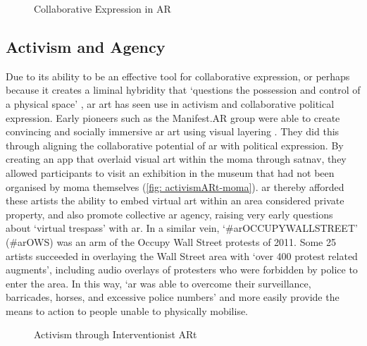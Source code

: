 \begin{figure}[ht]
    \centering
    \captionsetup{justification=centering}
    \hfill
    \caption{Collaborative Expression in AR}
    \label{fig: collaborativeARt}
\end{figure}

\subsection{Activism and Agency}\label{sec: ar-arts-activism}
Due to its ability to be an effective tool for collaborative expression, or perhaps because it creates a liminal hybridity that `questions the possession and control of a physical space' \citep{thiel2018}, \gls{ar} art has seen use in activism and collaborative political expression. Early pioneers such as the Manifest.AR group were able to create convincing and socially immersive \gls{ar} art using visual layering \citep{veenhof2010}. They did this through aligning the collaborative potential of \gls{ar} with political expression. By creating an app that overlaid visual art within the \gls{moma} through \gls{satnav}, they allowed participants to visit an exhibition in the museum that had not been organised by \gls{moma} themselves (\autoref{fig: activismARt-moma}). \gls{ar} thereby afforded these artists the ability to embed virtual art within an area considered private property, and also promote collective \gls{ar} agency, raising very early questions about `virtual trespass' with \gls{ar}. In a similar vein, `\#arOCCUPYWALLSTREET' (\#arOWS) was an arm of the Occupy Wall Street protests of 2011. Some 25 artists succeeded in overlaying the Wall Street area with `over 400 protest related augments', including audio overlays of protesters who were forbidden by police to enter the area. In this way, `\gls{ar} was able to overcome their surveillance, barricades, horses, and excessive police numbers' \citeyearpar{skwarek2018} and more easily provide the means to action to people unable to physically mobilise.

\begin{figure}
    \centering
    \captionsetup{justification=centering}
    \hfill
    \caption{Activism through Interventionist ARt}
    \label{fig: activismARt}
\end{figure}

